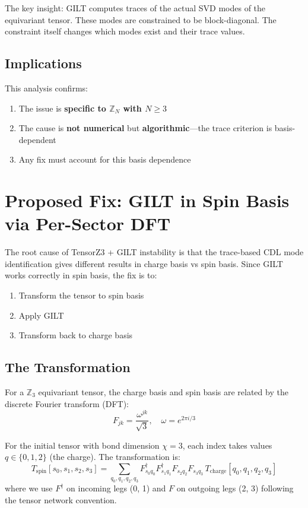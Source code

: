 \documentclass{article}
\begin{document}
The key insight: GILT computes traces of the actual SVD modes of the equivariant tensor. These modes are constrained to be block-diagonal. The constraint itself changes which modes exist and their trace values.

\subsection{Implications}

This analysis confirms:
\begin{enumerate}
    \item The issue is \textbf{specific to $\mathbb{Z}_N$ with $N \geq 3$}
    \item The cause is \textbf{not numerical} but \textbf{algorithmic}---the trace criterion is basis-dependent
    \item Any fix must account for this basis dependence
\end{enumerate}

\section{Proposed Fix: GILT in Spin Basis via Per-Sector DFT}
\label{sec:spin_basis_fix}

The root cause of TensorZ3 + GILT instability is that the trace-based CDL mode identification gives different results in charge basis vs spin basis. Since GILT works correctly in spin basis, the fix is to:
\begin{enumerate}
    \item Transform the tensor to spin basis
    \item Apply GILT
    \item Transform back to charge basis
\end{enumerate}

\subsection{The Transformation}

For a $\mathbb{Z}_3$ equivariant tensor, the charge basis and spin basis are related by the discrete Fourier transform (DFT):
\begin{equation}
    F_{jk} = \frac{\omega^{jk}}{\sqrt{3}}, \quad \omega = e^{2\pi i/3}
\end{equation}

For the initial tensor with bond dimension $\chi = 3$, each index takes values $q \in \{0, 1, 2\}$ (the charge). The transformation is:
\begin{equation}
    T_{\text{spin}}[s_0, s_1, s_2, s_3] = \sum_{q_0, q_1, q_2, q_3} F^\dagger_{s_0 q_0} F^\dagger_{s_1 q_1} F_{s_2 q_2} F_{s_3 q_3} \, T_{\text{charge}}[q_0, q_1, q_2, q_3]
\end{equation}
where we use $F^\dagger$ on incoming legs (0, 1) and $F$ on outgoing legs (2, 3) following the tensor network convention.
\end{document}
